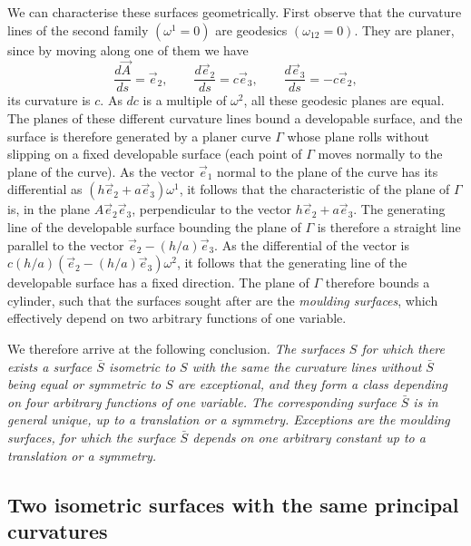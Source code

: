 \documentclass[leqno,11pt]{book}
\numberwithin{equation}{chapter}
\theoremstyle{shape1}
\theoremstyle{shape0}
\theoremstyle{shape2}
\theoremstyle{definition}
\begin{document}
\vspace{12pt}\fsec We can characterise these surfaces geometrically. First observe that the curvature lines of the second family $(\omega^{1}=0)$ are geodesics $(\omega_{12}=0)$. They are planer, since by moving along one of them we have
\[
\frac{d\vec A}{ds}=\vec e_{2},\qquad\frac{d\vec e_{2}}{ds}=c\vec e_{3},\qquad\frac{d\vec e_{3}}{ds}=-c\vec e_{2},
\]
its curvature is $c$. As $dc$ is a multiple of $\omega^{2}$, all these geodesic planes are equal. The planes of these different curvature lines bound a developable surface, and the surface is therefore generated by a planer curve $\Gamma$ whose plane rolls without slipping on a fixed developable surface (each point of $\Gamma$ moves normally to the plane of the curve). As the vector $\vec e_{1}$ normal to the plane of the curve has its differential as $(h\vec e_{2}+a\vec e_{3})\omega^{1}$, it follows that the characteristic of the plane of $\Gamma$ is, in the plane $A\vec e_{2}\vec e_{3}$,  perpendicular to the vector $h\vec e_{2}+a\vec e_{3}$. The generating line of the developable surface bounding the plane of $\Gamma$ is therefore a straight line parallel to the vector $\vec e_{2}-({h}/{a})\vec e_{3}$. As the differential of the vector is $c(h/a)(\vec e_{2}-(h/a)\vec e_{3})\omega^{2}$, it follows that the generating line of the developable surface has a fixed direction. The plane of $\Gamma$ therefore bounds a cylinder, such that the surfaces sought after are the \emph{moulding surfaces}, which effectively depend on two arbitrary functions of one variable.

We therefore arrive at the following conclusion. \emph{The surfaces $S$ for which there exists a surface $\bar S$ isometric to $S$ with the same the curvature lines without $\bar S$ being equal or symmetric to $S$ are exceptional, and they form a class depending on four arbitrary functions of one variable. The corresponding surface  $\bar S$ is in general unique, up to a translation or a symmetry. Exceptions are the moulding surfaces, for which the surface $\bar S$ depends on one arbitrary constant up to a translation or a symmetry.}


\subsection{Two isometric surfaces with the same principal curvatures}
\label{sec:some-isoth-surf-3}
\end{document}
